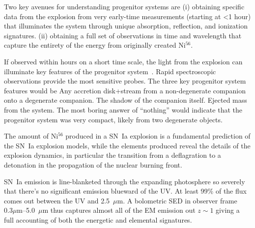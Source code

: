 \documentclass[12pt,preprint]{aastex}
\newcommand{\snia}{SN~Ia\xspace}
\newcommand{\tbd}{{\color{red}}}
\begin{document}
Two key avenues for understanding progenitor systems are
(i) obtaining specific data from the explosion from very early-time measurements (starting at <1 hour) that illuminates the system through unique absorption, reflection, and ionization signatures.
(ii) obtaining a full set of observations in time and wavelength that capture the entirety of the energy from originally created Ni$^{56}$.

If observed within hours on a short time scale, the light from the explosion can illuminate key features of the progenitor system~\citep{Ganeshalingam11, Foley12, Noebauer17, Dimitriadis19}.  Rapid spectroscopic observations provide the most sensitive probes.  The three key progenitor system features would be
{\bf *} Any accretion disk+stream from a non-degenerate companion onto a degenerate companion.
{\bf *} The shadow of the companion itself.
{\bf *} Ejected mass from the system.
The most boring answer of ``nothing'' would indicate that the progenitor system was very compact, likely from two degenerate objects.

\iffalse
\subsection{Current Limits from K2, ASASSN Supernovae}

{\tbd Quote and describe the current work with early-time lightcurves from K2, ASASSN}

{\tbd If something comes out of ZTF, add that here.}
\fi

The amount of Ni$^{56}$ produced in a SN~Ia explosion is a fundamental prediction of the SN~Ia explosion models, while the elements produced reveal the details of the explosion dynamics, in particular the transition from a deflagration to a detonation in the propagation of the nuclear burning front.

\snia emission is line-blanketed through the expanding photosphere so severely that there's no significant emission blueward of the UV.  At least 99\% of the flux comes out between the UV and 2.5~$\mu$m.  A bolometric SED in observer frame $0.3\mu$m--5.0~$\mu$m thus captures almost all of the EM emission out $z\sim1$ giving a full accounting of both the energetic and elemental signatures.
\end{document}
